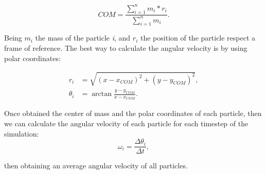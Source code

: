 \begin{equation}
  COM = \displaystyle\frac{\sum^{n}_{i=1} m_i * r_i}{\sum^{n}_{i=1} m_i}.
  \label{eq:centerofmass}
\end{equation}

Being $m_i$ the mass of the particle \textit{i}, and $r_i$ the position of the particle respect a frame of reference. The best way to calculate the angular velocity is by using polar coordinates:

\begin{align}
  r_i & = \sqrt{(x - x_{COM})^2 + (y - y_{COM})^2},\\ 
  \theta _i &= \arctan{\frac{y - y_{COM}}{x - x_{COM}}}.
\end{align}

Once obtained the center of mass and the polar coordinates of each particle, then we can calculate the angular velocity of each particle for each timestep of the simulation:
\begin{equation}
  \omega _i = \frac{\Delta \theta _i}{\Delta t},
  \label{eq:angularvelocity}
\end{equation}

then obtaining an average angular velocity of all particles.


